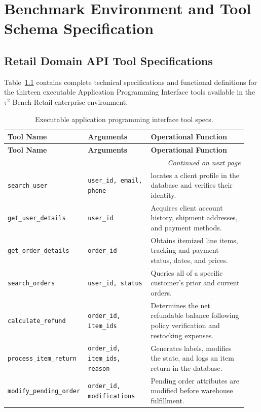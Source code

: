 \documentclass[a4paper, 12pt]{report}
\begin{document}
\appendix
\chapter{Benchmark Environment and Tool Schema Specification}
\fi

\label{appendix.A}
\section{Retail Domain API Tool Specifications}
Table~\ref{tab:tool_spec} contains complete technical specifications and functional definitions for the thirteen executable Application Programming Interface tools available in the $\tau^2$-Bench Retail enterprise environment.

\begingroup
\small
\renewcommand{\arraystretch}{0.92}
\begin{longtable}{p{0.28\linewidth}p{0.26\linewidth}p{0.40\linewidth}}
\caption{Executable application programming interface tool specs.} \label{tab:tool_spec} \\
\toprule
\textbf{Tool Name} & \textbf{Arguments} & \textbf{Operational Function} \\
\midrule
\endfirsthead
\toprule
\textbf{Tool Name} & \textbf{Arguments} & \textbf{Operational Function} \\
\midrule
\endhead
\midrule
\multicolumn{3}{r}{\textit{Continued on next page}} \\
\bottomrule
\endfoot
\bottomrule
\endlastfoot
\texttt{search\_user} & \texttt{user\_id, email, phone} & locates a client profile in the database and verifies their identity. \\
\texttt{get\_user\_details} & \texttt{user\_id} & Acquires client account history, shipment addresses, and payment methods. \\
\texttt{get\_order\_details} & \texttt{order\_id} & Obtains itemized line items, tracking and payment status, dates, and prices. \\
\texttt{search\_orders} & \texttt{user\_id, status} & Queries all of a specific customer's prior and current orders. \\
\texttt{calculate\_refund} & \texttt{order\_id, item\_ids} & Determines the net refundable balance following policy verification and restocking expenses. \\
\texttt{process\_item\_return} & \texttt{order\_id, item\_ids, reason} & Generates labels, modifies the state, and logs an item return in the database. \\
\texttt{modify\_pending\_order} & \texttt{order\_id, modifications} & Pending order attributes are modified before warehouse fulfillment. \\

\end{longtable}
\end{document}
